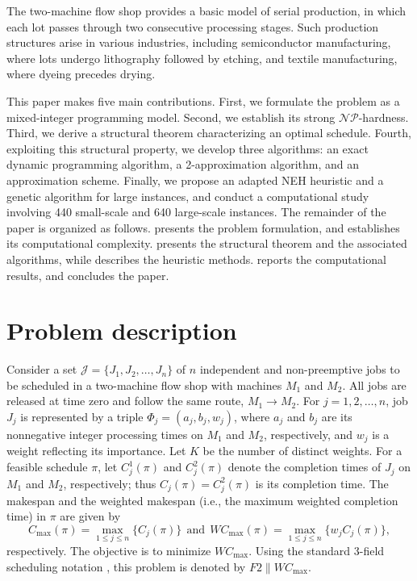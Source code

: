 ﻿\documentclass[12pt]{article}
\let\origsection\section
\renewcommand{\section}{\FloatBarrier\origsection}
\begin{document}
\begin{sloppypar}
The two-machine flow shop provides a basic model of serial production, in which each lot
passes through two consecutive processing stages. Such production structures arise in various
industries, including semiconductor manufacturing, where lots undergo lithography followed
by etching, and textile manufacturing, where dyeing precedes drying.

This paper makes five main contributions. First, we formulate the problem as a mixed-integer
programming model. Second, we establish its strong $\mathcal{NP}$-hardness. Third, we derive a
structural theorem characterizing an optimal schedule. Fourth, exploiting this structural
property, we develop three algorithms: an exact dynamic programming algorithm, a
2-approximation algorithm, and an approximation scheme. Finally, we propose an adapted NEH
heuristic and a genetic algorithm for large instances, and conduct a computational study
involving 440 small-scale and 640 large-scale instances. The remainder of the paper is
organized as follows.  presents the problem formulation, and
 establishes its computational complexity. 
presents the structural theorem and the associated algorithms, while
 describes the heuristic methods.  reports the
computational results, and  concludes the paper.



\section{Problem description}    
\label{sec:preliminaries}

Consider a set $\mathcal{J} = \{J_1, J_2, \dots, J_n\}$ of $n$ independent and non-preemptive jobs to be scheduled 
in a two-machine flow shop with machines $M_1$ and $M_2$. All jobs are released at time zero and follow the same route,
$M_1 \to M_2$. For $j=1, 2, \ldots, n$, job $J_j$ is represented by a triple $\Phi_j=(a_j, b_j, w_j)$, where $a_j$ 
and $b_j$ are its nonnegative integer processing times on $M_1$ and $M_2$, respectively, and $w_j$ is a weight 
reflecting its importance. Let $K$ be the number of distinct weights.
For a feasible schedule $\pi$, let $C_j^1(\pi)$ and $C_j^2(\pi)$ denote the completion times of $J_j$ on $M_1$ and $M_2$, 
respectively; thus $C_j(\pi)=C_j^2(\pi)$ is its completion time. The makespan and 
the weighted makespan (i.e., the maximum weighted completion time) in $\pi$ are given by 
\begin{equation*}
C_{\max}(\pi)=\max_{1 \leq j \leq n} \{C_j(\pi)\} ~~ \mathrm{and} ~~ WC_{\max}(\pi)=\max_{1 \leq j \leq n} \{w_j C_j(\pi)\},
\end{equation*}
respectively. The objective is to minimize $WC_{\max}$. 
Using the standard 3-field scheduling notation \citep{pinedo2022scheduling}, 
this problem is denoted by $F2 \parallel WC_{\max}$.


\end{sloppypar}
\end{document}
